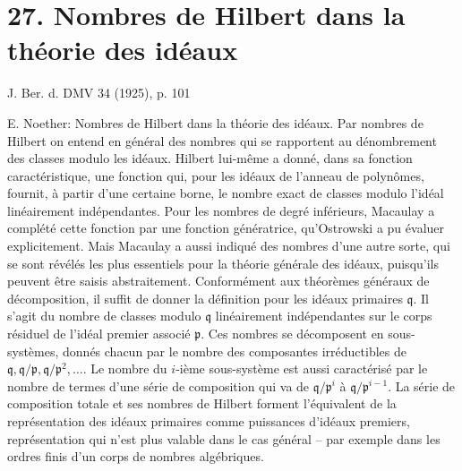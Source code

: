 
\section*{27. Nombres de Hilbert dans la théorie des idéaux}

\begin{center}
J. Ber. d. DMV 34 (1925), p. 101
\end{center}

E. Noether: Nombres de Hilbert dans la théorie des idéaux. Par nombres de Hilbert on entend en général des nombres qui se rapportent au dénombrement des classes modulo les idéaux. Hilbert lui-même a donné, dans sa \og{}fonction caractéristique\fg{}, une fonction qui, pour les idéaux de l'anneau de polynômes, fournit, à partir d'une certaine borne, le nombre exact de classes modulo l'idéal linéairement indépendantes. Pour les nombres de degré inférieurs, Macaulay a complété cette fonction par une fonction génératrice, qu'Ostrowski a pu évaluer explicitement. Mais Macaulay a aussi indiqué des nombres d'une autre sorte, qui se sont révélés les plus essentiels pour la théorie générale des idéaux, puisqu'ils peuvent être saisis abstraitement. Conformément aux théorèmes généraux de décomposition, il suffit de donner la définition pour les idéaux primaires $\mathfrak q$. Il s'agit du nombre de classes modulo $\mathfrak q$ linéairement indépendantes sur le corps résiduel de l'idéal premier associé $\mathfrak p$. Ces nombres se décomposent en sous-systèmes, donnés chacun par le nombre des composantes irréductibles de $\mathfrak q,\mathfrak q/\mathfrak p,\mathfrak q/\mathfrak p^2,\ldots$. Le nombre du $i$-ième sous-système est aussi caractérisé par le nombre de termes d'une série de composition qui va de $\mathfrak q/\mathfrak p^i$ à $\mathfrak q/\mathfrak p^{i-1}$. La série de composition totale et ses nombres de Hilbert forment l'équivalent de la représentation des idéaux primaires comme puissances d'idéaux premiers, représentation qui n'est plus valable dans le cas général -- par exemple dans les ordres finis d'un corps de nombres algébriques.
